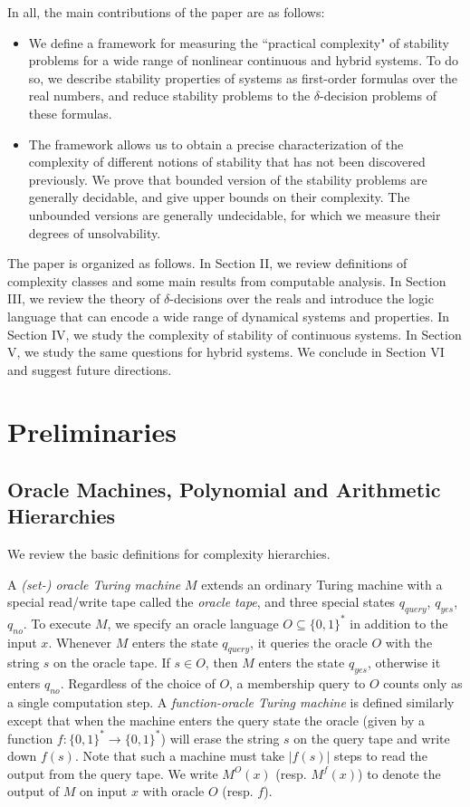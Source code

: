 \documentclass[12pt]{article}
\theoremstyle{plain}
\theoremstyle{definition}
\begin{document}
In all, the main contributions of the paper are as follows:
\begin{itemize}
\item We define a framework for measuring the ``practical complexity" of stability problems for a wide range of nonlinear continuous and hybrid systems. To do so, we describe stability properties of systems as first-order formulas over the real numbers, and reduce stability problems to the $\delta$-decision problems of these formulas.
\item The framework allows us to obtain a precise characterization of the complexity of different notions of stability that has not been discovered previously. We prove that bounded version of the stability problems are generally decidable, and give upper bounds on their complexity. The unbounded versions are generally undecidable, for which we measure their degrees of unsolvability.
\end{itemize}
The paper is organized as follows. In Section II, we review definitions of complexity classes and some main results from computable analysis. In Section III, we review the theory of $\delta$-decisions over the reals and introduce the logic language that can encode a wide range of dynamical systems and properties. In Section IV, we study the complexity of stability of continuous systems. In Section V, we study the same questions for hybrid systems. We conclude in Section VI and suggest future directions.

\section{Preliminaries}
\subsection{Oracle Machines, Polynomial and Arithmetic Hierarchies}

We review the basic definitions for complexity hierarchies.

A {\em (set-) oracle Turing machine} $M$ extends an ordinary Turing machine with a special read/write tape called the {\em oracle tape}, and three special states $q_{\mathit{query}}$, $q_{\mathit{yes}}$, $q_{\mathit{no}}$. To execute $M$, we specify an oracle language $O\subseteq \{0,1\}^*$ in addition to the input $x$. Whenever $M$ enters the state $q_{\mathit{query}}$, it queries the oracle $O$ with the string $s$ on the oracle tape. If $s\in O$, then $M$ enters the state $q_{\mathit{yes}}$, otherwise it enters $q_{\mathit{no}}$. Regardless of the choice of $O$, a membership query to $O$ counts only as a single computation step. A {\em function-oracle Turing machine} is defined similarly except that when the machine enters the query state the oracle (given by a function $f:\{0,1\}^*\rightarrow\{0,1\}^*$) will erase the string $s$ on the query tape and write down $f(s)$. Note that such a machine must take $|f(s)|$ steps to read the output from the query tape. We write $M^O(x)$ (resp. $M^f(x)$) to denote the output of $M$ on input $x$ with oracle $O$ (resp. $f$).
\end{document}
